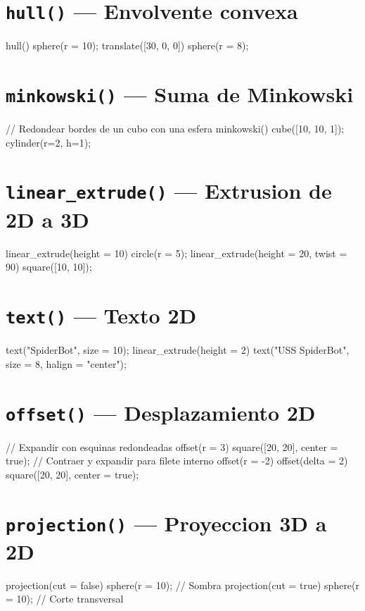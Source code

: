 \documentclass[12pt, oneside, a4paper]{report}
\newcommand{\codigo}[1]{\texttt{#1}}
\begin{document}
\section{\codigo{hull()} --- Envolvente convexa}
\begin{openscad}
hull() {
    sphere(r = 10);
    translate([30, 0, 0])
        sphere(r = 8);
}
\end{openscad}

\section{\codigo{minkowski()} --- Suma de Minkowski}
\begin{openscad}
// Redondear bordes de un cubo con una esfera
minkowski() {
    cube([10, 10, 1]);
    cylinder(r=2, h=1);
}
\end{openscad}

\section{\codigo{linear\_extrude()} --- Extrusion de 2D a 3D}
\begin{openscad}
linear_extrude(height = 10) { circle(r = 5); }
linear_extrude(height = 20, twist = 90) { square([10, 10]); }
\end{openscad}

\section{\codigo{text()} --- Texto 2D}
\begin{openscad}
text("SpiderBot", size = 10);
linear_extrude(height = 2)
    text("USS SpiderBot", size = 8, halign = "center");
\end{openscad}

\section{\codigo{offset()} --- Desplazamiento 2D}
\begin{openscad}
// Expandir con esquinas redondeadas
offset(r = 3) square([20, 20], center = true);
// Contraer y expandir para filete interno
offset(r = -2) offset(delta = 2)
    square([20, 20], center = true);
\end{openscad}

\section{\codigo{projection()} --- Proyeccion 3D a 2D}
\begin{openscad}
projection(cut = false) sphere(r = 10);  // Sombra
projection(cut = true)  sphere(r = 10);  // Corte transversal
\end{openscad}
\end{document}
